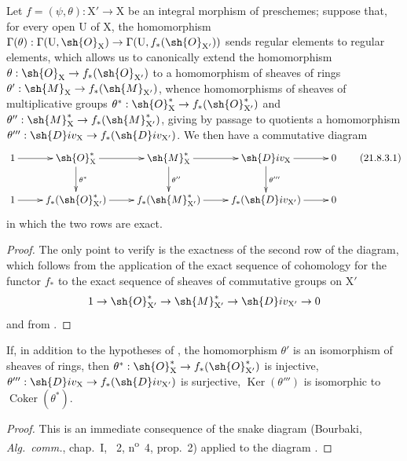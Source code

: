 \begin{proposition}[21.8.3]
\label{IV.21.8.3}
Let $f=(\psi,\theta):\mathrm{X}'\to\mathrm{X}$ be an integral morphism of preschemes;
suppose that, for every open $\mathrm{U}$ of $\mathrm{X}$, the homomorphism $\Gamma(\theta):\Gamma(\mathrm{U},\sh{O}_\mathrm{X})\to\Gamma(\mathrm{U},f_*(\sh{O}_{\mathrm{X}'}))$ sends regular elements to regular elements, which allows us to canonically extend the homomorphism $\theta:\sh{O}_\mathrm{X}\to f_*(\sh{O}_{\mathrm{X}'})$ to a homomorphism of sheaves of rings $\theta':\sh{M}_\mathrm{X}\to f_*(\sh{M}_{\mathrm{X}'})$, whence homomorphisms of sheaves of multiplicative groups $\theta^*:\sh{O}^*_\mathrm{X}\to f_*(\sh{O}^*_{\mathrm{X}'})$ and $\theta'':\sh{M}^*_\mathrm{X}\to f_*(\sh{M}^*_{\mathrm{X}'})$, giving by passage to quotients a homomorphism $\theta''':\sh{D}iv_\mathrm{X}\to f_*(\sh{D}iv_{\mathrm{X}'})$.
We then have a commutative diagram
\[
\label{IV.21.8.3.1}
  \xymatrix{
    1 \ar[r] & \sh{O}^*_\mathrm{X} \ar[r] \ar[d]^{\theta^*} & \sh{M}^*_\mathrm{X} \ar[r] \ar[d]^{\theta''} & \sh{D}iv_\mathrm{X} \ar[r] \ar[d]^{\theta'''} & 0\\
    1 \ar[r] & f_*(\sh{O}^*_{\mathrm{X}'}) \ar[r] & f_*(\sh{M}^*_{\mathrm{X}'}) \ar[r] & f_*(\sh{D}iv_{\mathrm{X}'}) \ar[r] & 0
  }
  \tag{21.8.3.1}
\]
in which the two rows are exact.
\end{proposition}

\begin{proof}
The only point to verify is the exactness of the second row of the diagram, which follows from the application of the exact sequence of cohomology for the functor $f_*$ to the exact sequence of sheaves of commutative groups on $\mathrm{X}'$
\[
  1\to\sh{O}^*_{\mathrm{X}'}\to\sh{M}^*_{\mathrm{X}'}\to\sh{D}iv_{\mathrm{X}'}\to 0
\]
and from .
\end{proof}

\begin{corollary}[21.8.4]
\label{IV.21.8.4}
If, in addition to the hypotheses of , the homomorphism $\theta'$ is an isomorphism of sheaves of rings, then $\theta^*:\sh{O}^*_\mathrm{X}\to f_*(\sh{O}^*_{\mathrm{X}'})$ is injective, $\theta''':\sh{D}iv_\mathrm{X}\to f_*(\sh{D}iv_{\mathrm{X}'})$ is surjective, $\operatorname{Ker}(\theta''')$ is isomorphic to $\operatorname{Coker}(\theta^*)$.
\end{corollary}

\begin{proof}
This is an immediate consequence of the snake diagram (Bourbaki, \emph{Alg.\ comm.}, chap.~I, \textsection~2, n\textsuperscript{o}~4, prop.~2) applied to the diagram .
\end{proof}

